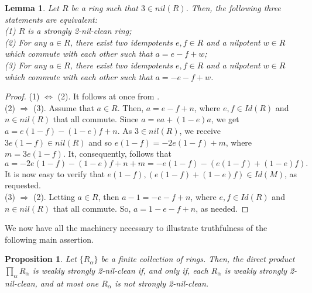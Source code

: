 \documentclass[12pt]{amsart}
\newtheorem{proposition}[theorem]{Proposition}
\newtheorem{lemma}[theorem]{Lemma}
\theoremstyle{definition}
\begin{document}
\begin{lemma}\label{2nil} Let $R$ be a ring such that $3\in nil(R)$. Then, the following three statements are equivalent:\\\indent (1) $R$ is a strongly 2-nil-clean ring;\\\indent (2) For any $a \in R$, there exist two idempotents $e, f \in R$ and a nilpotent $w\in  R$ which commute with each other such that $a = e - f + w$;\\\indent  (3) For any $a \in R$, there exist two idempotents $e, f \in R$ and a nilpotent $w\in  R$ which commute with each other such that $a = -e - f + w$.
\end{lemma}

\begin{proof} (1) $\Leftrightarrow$ (2). It follows at once from \cite[Lemma 2.2]{chen}.\\
(2) $\Rightarrow$ (3). Assume that $a\in R$. Then, $a=e-f+n$, where $e,f\in Id(R)$ and $n\in nil(R)$ that all commute. Since $a=ea+(1-e)a$, we get $a=e(1-f)-(1-e)f+n$. As $3\in nil(R)$, we receive $3e(1-f)\in nil(R)$ and so $e(1-f)=-2e(1-f)+m$, where $m=3e(1-f)$. It, consequently, follows that $$a=-2e(1-f)-(1-e)f+n+m=-e(1-f)-(e(1-f)+(1-e)f).$$ It is now easy to verify that $e(1-f), (e(1-f)+(1-e)f)\in Id(M)$, as requested.\\\indent (3) $\Rightarrow$ (2). Letting $a\in R$, then $a-1=-e-f+n$, where $e,f\in Id(R)$ and $n\in nil(R)$ that all commute. So, $a=1-e-f+n$, as needed.
\end{proof}

We now have all the machinery necessary to illustrate truthfulness of the following main assertion.

\begin{proposition}\label{2.2} Let $\{R_{\alpha}\}$ be a finite collection of rings. Then, the direct product
$\prod_{\alpha} R_{\alpha}$ is weakly strongly 2-nil-clean if, and only if, each $R_{\alpha}$ is weakly strongly 2-nil-clean, and at most one $R_{\alpha}$ is not strongly 2-nil-clean.
\end{proposition}
\end{document}
